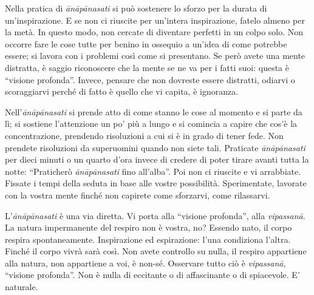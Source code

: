 Nella pratica di \textit{ānāpānasati} si può sostenere lo sforzo per la durata di
un'inspirazione. E se non ci riuscite per un'intera inspirazione, fatelo
almeno per la metà. In questo modo, non cercate di diventare perfetti in
un colpo solo. Non occorre fare le cose tutte per benino in ossequio a
un'idea di come potrebbe essere; si lavora con i problemi così come si
presentano. Se però avete una mente distratta, è saggio riconoscere che
la mente se ne va per i fatti suoi: questa è ``visione profonda”. Invece,
pensare che non dovreste essere distratti, odiarvi o scoraggiarvi perché
di fatto è quello che vi capita, è ignoranza.

Nell'\textit{ānāpānasati} si prende atto di come stanno le cose al momento e si
parte da lì; si sostiene l'attenzione un po' più a lungo e si comincia a
capire che cos'è la concentrazione, prendendo risoluzioni a cui si è in
grado di tener fede. Non prendete risoluzioni da superuomini quando non
siete tali. Praticate \textit{ānāpānasati} per dieci minuti o un quarto d'ora
invece di credere di poter tirare avanti tutta la notte: ``Praticherò
\textit{ānāpānasati} fino all'alba''. Poi non ci riuscite e vi arrabbiate. Fissate
i tempi della seduta in base alle vostre possibilità. Sperimentate,
lavorate con la vostra mente finché non capirete come sforzarvi, come
rilassarvi.

L'\textit{ānāpānasati} è una via diretta. Vi porta alla ``visione profonda”, alla
\textit{vipassanā}. La natura impermanente del respiro non è vostra, no? Essendo
nato, il corpo respira spontaneamente. Inspirazione ed espirazione:
l'una condiziona l'altra. Finché il corpo vivrà sarà così. Non avete
controllo su nulla, il respiro appartiene alla natura, non appartiene a
voi, è non-sé. Osservare tutto ciò è \textit{vipassanā}, ``visione profonda”. Non
è nulla di eccitante o di affascinante o di spiacevole. E' naturale.

